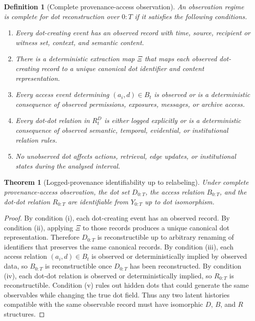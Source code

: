 \documentclass[11pt]{article}
\newtheorem{definition}{Definition}
\newtheorem{theorem}{Theorem}
\theoremstyle{remark}
\begin{document}
\begin{definition}[Complete provenance-access observation]\label{def:complete-provenance-access-observation}
An observation regime is complete for dot reconstruction over $0:T$ if
it satisfies the following conditions.

\begin{enumerate}[label=(\roman*)]
\item Every dot-creating event has an observed record with time, source,
recipient or witness set, context, and semantic content.
\item There is a deterministic extraction map $\Xi$ that maps each
observed dot-creating record to a unique canonical dot identifier and
content representation.
\item Every access event determining $(a_i,d)\in B_t$ is observed or
is a deterministic consequence of observed permissions, exposures,
messages, or archive access.
\item Every dot-dot relation in $R_t^D$ is either logged explicitly or is a
deterministic consequence of observed semantic, temporal, evidential, or
institutional relation rules.
\item No unobserved dot affects actions, retrieval, edge updates, or
institutional states during the analysed interval.
\end{enumerate}
\end{definition}

\begin{theorem}[Logged-provenance identifiability up to relabeling]\label{thm:logged-provenance-identifiability}
Under complete provenance-access observation, the dot set $D_{0:T}$, the
access relation $B_{0:T}$, and the dot-dot relation $R_{0:T}$ are
identifiable from $Y_{0:T}$ up to dot isomorphism.
\end{theorem}

\begin{proof}
By condition (i), each dot-creating event has an observed record. By
condition (ii), applying $\Xi$ to those records produces a unique
canonical dot representation. Therefore $D_{0:T}$ is reconstructible up
to arbitrary renaming of identifiers that preserves the same canonical
records. By condition (iii), each access relation $(a_i,d)\in B_t$ is
observed or deterministically implied by observed data, so $B_{0:T}$ is
reconstructible once $D_{0:T}$ has been reconstructed. By condition
(iv), each dot-dot relation is observed or deterministically implied, so
$R_{0:T}$ is reconstructible. Condition (v) rules out hidden dots that
could generate the same observables while changing the true dot field.
Thus any two latent histories compatible with the same observable record
must have isomorphic $D$, $B$, and $R$ structures.
\end{proof}
\end{document}
